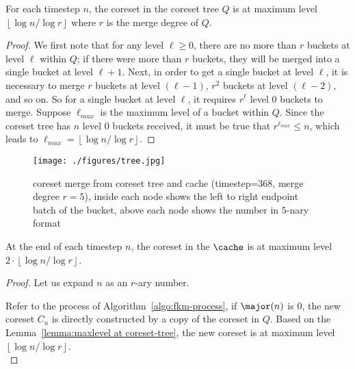 {%
\begin{lemma}
\label{lemma:maxlevel at coreset-tree}
For each timestep $n$, the coreset in the coreset tree $Q$ is at maximum level $\left\lfloor \log n/\log r \right\rfloor$ where $r$ is the merge degree of $Q$.
\end{lemma}
\begin{proof}
We first note that for any level $\ell \ge 0$, there are no more than $r$ buckets at level $\ell$ within $Q$; if there were more than $r$ buckets, they will be merged into a single bucket at level $\ell+1$. Next, in order to get a single bucket at level $\ell$, it is necessary to merge $r$ buckets at level $(\ell-1)$, $r^2$ buckets at level $(\ell-2)$, and so on. So for a single bucket at level $\ell$, it requires $r^{\ell}$ level $0$ buckets to merge. Suppose $\ell_{max}$ is the maximum level of a bucket within $Q$. Since the coreset tree has $n$ level $0$ buckets received, it must be true that $r^{\ell_{max}} \le n$, which leads to $\ell_{max} = \left\lfloor \log n/\log r \right\rfloor$.
\end{proof}

\begin{figure*}
  \centering
  \texttt{[image: ./figures/tree.jpg]}
  \caption{coreset merge from coreset tree and cache (timestep=$368$, merge degree $r=5$), 
  inside each node shows the left to right endpoint batch of the bucket, 
  above each node shows the number in $5$-nary format}
  \label{fig:coreset merge}
\end{figure*}

\begin{lemma}
\label{lemma:maxlevel at cache}
At the end of each timestep $n$, the coreset in the $\cache$ is at maximum level $2 \cdot \left\lfloor \log n/\log r \right\rfloor$.
\end{lemma}

\begin{proof}
Let us expand $n$ as an $r$-ary number.

Refer to the process of Algorithm~\ref{algo:fkm-process}, if $\major(n)$ is $0$, the new coreset $C_n$ is directly constructed by a copy of the coreset in $Q$. Based on the Lemma~\ref{lemma:maxlevel at coreset-tree}, the new coreset is at maximum level $\left\lfloor \log n/\log r \right\rfloor$. \\


\end{proof}}
